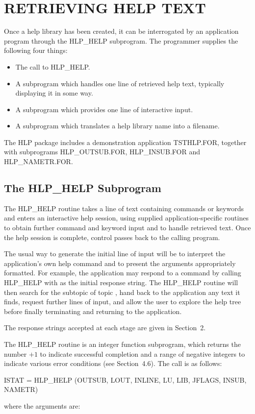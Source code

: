 \documentclass[11pt,nolof]{starlink}
\providecommand{\qt}[1]{``{\tt{#1}}''}
\providecommand{\fstring}[1]{\hbox{\hspace{0.05em}{\qt{#1}}\hspace{0.05em}}}
\begin{document}
\section{RETRIEVING HELP TEXT}
Once a help library has been created, it can be interrogated by an
application program through the HLP\_HELP subprogram.  The programmer
supplies the following four things:
\begin{itemize}
\item The call to HLP\_HELP.
\item A subprogram which handles one line of retrieved help text,
typically displaying it in some way.
\item A subprogram which provides one line of interactive input.
\item A subprogram which translates a help library name into a filename.
\end{itemize}

The HLP package includes a demonstration application TSTHLP.FOR,
together with subprograms HLP\_OUTSUB.FOR, HLP\_INSUB.FOR and HLP\_NAMETR.FOR.

\subsection{The HLP\_HELP Subprogram}
The HLP\_HELP routine takes a line of text containing commands
or keywords and enters an interactive help session, using supplied
application-specific routines to obtain further command and keyword
input and to handle retrieved text.  Once the help session is complete,
control passes back to the calling program.

The usual way to generate the initial line of input will be to
interpret the application's own help command and to present the
arguments appropriately formatted.  For example, the application may
respond to a command \fstring{HELP COMP C} by calling HLP\_HELP with
\fstring{COMP C} as the initial response string.  The HLP\_HELP routine
will then search for the subtopic \fstring{C} of topic \fstring{COMP},
hand back to the application any text it finds, request further lines
of input, and allow the user to explore the help tree before finally
terminating and returning to the application.

The response strings accepted at each stage are given in
Section~2.

The HLP\_HELP routine is an integer function subprogram, which
returns the number $+1$ to indicate successful completion and a
range of negative integers to indicate various error conditions
(see Section~4.6).  The call is as follows:
\begin{terminalv}
ISTAT = HLP_HELP (OUTSUB, LOUT, INLINE, LU, LIB, JFLAGS, INSUB, NAMETR)
\end{terminalv}
where the arguments are:
\end{document}
